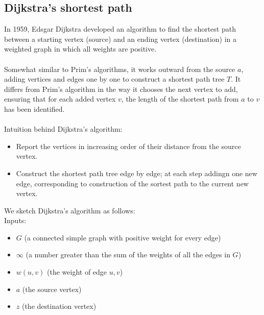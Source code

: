 \documentclass[a4paper]{article}
\begin{document}
\subsection{Dijkstra's shortest path}
In 1959, Edsgar Dijkstra developed an algorithm to find the shortest path between a starting vertex (source) and an ending vertex (destination) in a weighted graph in which all weights are positive.\\\\
Somewhat similar to Prim’s algorithms, it works outward from the source $a$, adding vertices and edges one by one to construct a shortest path tree $T$. It differs from Prim’s algorithm in the way it chooses the next vertex to add, ensuring that for each added vertex $v$, the length of the shortest path from $a$ to $v$ has been identified.\\\\
Intuition behind Dijkstra's algorithm:
\begin{itemize}
	\item Report the vertices in increasing order of their distance from the source vertex.
	\item Construct the shortest path tree edge by edge; at each step addingn one new edge, corresponding to construction of the sortest path to the current new vertex.
\end{itemize}
We sketch Dijkstra's algorithm as follows:\\
Inputs: 
\begin{itemize}
	\itemsep -0.5em
	\item $G$ (a connected simple graph with positive weight for every edge)
	\item $\infty$ (a number greater than the sum of the weights of all the edges in $G$)
	\item $w(u,v)$ (the weight of edge {$u,v$})
	\item $a$ (the source vertex)
	\item $z$ (the destination vertex)
\end{itemize}
\end{document}
